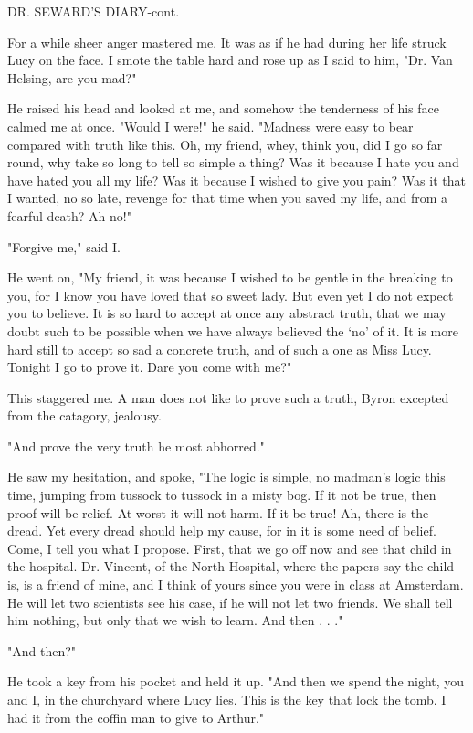 DR. SEWARD'S DIARY-cont. 

For a while sheer anger mastered me. It was as if he had during her life struck Lucy on the face. I smote the table hard and rose up as I said to him, "Dr. Van Helsing, are you mad?" 

He raised his head and looked at me, and somehow the tenderness of his face calmed me at once. "Would I were!" he said. "Madness were easy to bear compared with truth like this. Oh, my friend, whey, think you, did I go so far round, why take so long to tell so simple a thing? Was it because I hate you and have hated you all my life? Was it because I wished to give you pain? Was it that I wanted, no so late, revenge for that time when you saved my life, and from a fearful death? Ah no!" 

"Forgive me," said I. 

He went on, "My friend, it was because I wished to be gentle in the breaking to you, for I know you have loved that so sweet lady. But even yet I do not expect you to believe. It is so hard to accept at once any abstract truth, that we may doubt such to be possible when we have always believed the `no' of it. It is more hard still to accept so sad a concrete truth, and of such a one as Miss Lucy. Tonight I go to prove it. Dare you come with me?" 

This staggered me. A man does not like to prove such a truth, Byron excepted from the catagory, jealousy. 

"And prove the very truth he most abhorred." 

He saw my hesitation, and spoke, "The logic is simple, no madman's logic this time, jumping from tussock to tussock in a misty bog. If it not be true, then proof will be relief. At worst it will not harm. If it be true! Ah, there is the dread. Yet every dread should help my cause, for in it is some need of belief. Come, I tell you what I propose. First, that we go off now and see that child in the hospital. Dr. Vincent, of the North Hospital, where the papers say the child is, is a friend of mine, and I think of yours since you were in class at Amsterdam. He will let two scientists see his case, if he will not let two friends. We shall tell him nothing, but only that we wish to learn. And then . . ." 

"And then?" 

He took a key from his pocket and held it up. "And then we spend the night, you and I, in the churchyard where Lucy lies. This is the key that lock the tomb. I had it from the coffin man to give to Arthur." 


